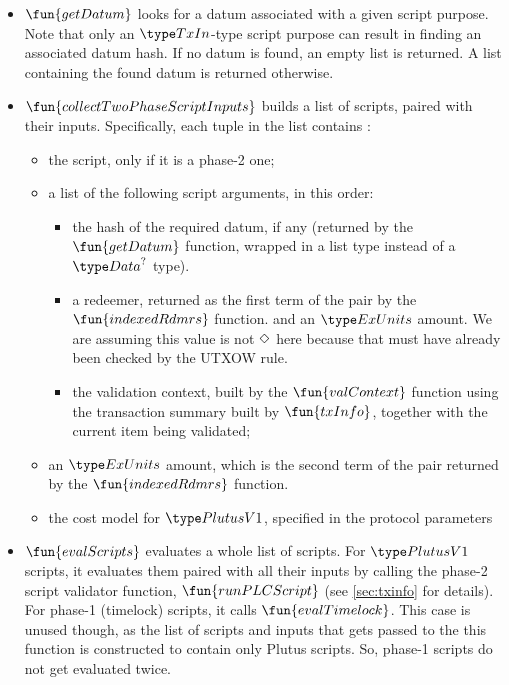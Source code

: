 \begin{itemize}
  \item $\fun{getDatum}$ looks for a datum associated with a given script purpose. Note that
  only an $\TxIn$-type script purpose can result in finding an associated datum hash.
  If no datum is found, an empty list is returned. A list containing the found datum
  is returned otherwise.

  \item $\fun{collectTwoPhaseScriptInputs}$ builds a list of scripts, paired with their
  inputs. Specifically, each tuple in the list contains :

  \begin{itemize}
  \item the script, only if it is a phase-2 one;

  \item a list of the following script arguments, in this order:

  \begin{itemize}
    \item the hash of the required datum, if any (returned by the $\fun{getDatum}$ function,
    wrapped in a list type instead of a $\Data^?$ type).

    \item a redeemer, returned as the first term of the pair by the $\fun{indexedRdmrs}$ function.
    and an $\ExUnits$ amount. We are assuming this value is not $\Diamond$ here
    because that must have already been checked by the UTXOW rule.

    \item the validation context, built by the $\fun{valContext}$ function using
    the transaction summary built by $\fun{txInfo}$, together with the current item being validated;
  \end{itemize}

  \item an $\ExUnits$ amount, which is the second term of the pair returned by the $\fun{indexedRdmrs}$ function.

  \item the cost model for $\PlutusVI$, specified in the protocol parameters
  \end{itemize}

  \item $\fun{evalScripts}$ evaluates a whole list of scripts. For $\PlutusVI$ scripts,
  it evaluates them paired with all their
  inputs by calling the phase-2 script validator function, $\fun{runPLCScript}$ (see
  \ref{sec:txinfo} for details).
  For phase-1 (timelock) scripts, it calls $\fun{evalTimelock}$. This case
  is unused though, as
  the list of scripts and inputs that gets passed to the this function is constructed
  to contain only Plutus scripts. So, phase-1 scripts do not get evaluated twice.
\end{itemize}

